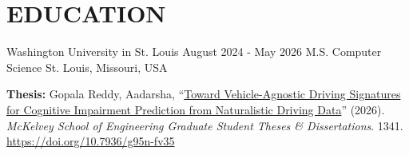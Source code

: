 \documentclass[10pt, letterpaper]{article}
\newif\ifwebcopy
\begin{document}

\vspace{\headerSpacing} %

\section{EDUCATION}

\begin{educationentry}
	{Washington University in St. Louis} %
	{August 2024 - May 2026} %
	{M.S. Computer Science} %
	{St. Louis, Missouri, USA} %
\begin{highlightsforbulletentries}
\item \textbf{Thesis:} Gopala Reddy, Aadarsha, ``\href{https://doi.org/10.7936/g95n-fv35}{Toward Vehicle-Agnostic Driving Signatures for Cognitive Impairment Prediction from Naturalistic Driving Data}'' (2026). \textit{McKelvey School of Engineering Graduate Student Theses \& Dissertations}. 1341. \href{https://doi.org/10.7936/g95n-fv35}{https://doi.org/10.7936/g95n-fv35}
\end{highlightsforbulletentries}
\end{educationentry}
\end{document}
